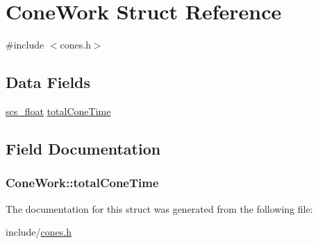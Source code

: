 \hypertarget{struct_cone_work}{\section{Cone\-Work Struct Reference}
\label{struct_cone_work}
}


{\ttfamily \#include $<$cones.\-h$>$}

\subsection*{Data Fields}
\begin{DoxyCompactItemize}
\item 
\hyperlink{glbopts_8h_ad37836e6404bb2c3ae8adcc6290699b9}{scs\-\_\-float} \hyperlink{struct_cone_work_aa6bdbd6d7f54f9b5c3ca04c22c872532}{total\-Cone\-Time}
\end{DoxyCompactItemize}


\subsection{Field Documentation}
\hypertarget{struct_cone_work_aa6bdbd6d7f54f9b5c3ca04c22c872532}{
\subsubsection[{total\-Cone\-Time}]{ Cone\-Work\-::total\-Cone\-Time}}\label{struct_cone_work_aa6bdbd6d7f54f9b5c3ca04c22c872532}


The documentation for this struct was generated from the following file\-:\begin{DoxyCompactItemize}
\item 
include/\hyperlink{cones_8h}{cones.\-h}\end{DoxyCompactItemize}
